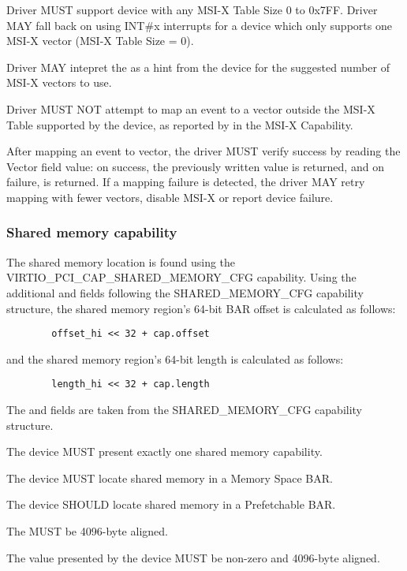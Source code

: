 Driver MUST support device with any MSI-X Table Size 0 to 0x7FF. Driver
MAY fall back on using INT\#x interrupts for a device which only
supports one MSI-X vector (MSI-X Table Size = 0).

Driver MAY intepret the  as a hint from the device for
the suggested number of MSI-X vectors to use.

Driver MUST NOT attempt to map an event to a vector outside the MSI-X
Table supported by the device, as reported by  in the
MSI-X Capability.

After mapping an event to vector, the driver MUST verify success by
reading the Vector field value: on success, the previously written value
is returned, and on failure,  is returned. If a mapping
failure is detected, the driver MAY retry mapping with fewer vectors,
disable MSI-X or report device failure.

\subsubsection{Shared memory capability}\label{sec:Device Types / Vhost-user Device Backend / Additional Device Resources over PCI / Shared Memory capability}

The shared memory location is found using the VIRTIO_PCI_CAP_SHARED_MEMORY_CFG
capability. Using the additional  and 
fields following the SHARED_MEMORY_CFG capability structure, the shared
memory region's 64-bit BAR offset is calculated as follows:

\begin{lstlisting}
        offset_hi << 32 + cap.offset
\end{lstlisting}

and the shared memory region's 64-bit length is calculated as follows:

\begin{lstlisting}
        length_hi << 32 + cap.length
\end{lstlisting}

The  and  fields are taken from the
SHARED_MEMORY_CFG capability structure.

The device MUST present exactly one shared memory capability.

The device MUST locate shared memory in a Memory Space BAR.

The device SHOULD locate shared memory in a Prefetchable BAR.

The  MUST be 4096-byte aligned.

The value  presented by the device MUST be non-zero and 4096-byte aligned.
